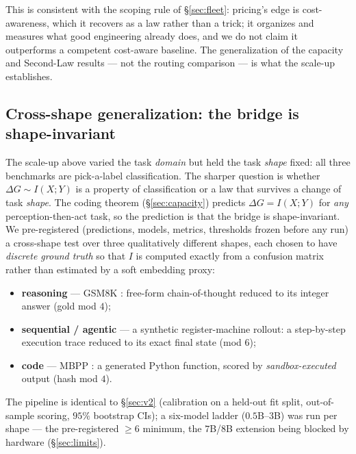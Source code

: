 \documentclass[11pt]{article}
\theoremstyle{plain}
\theoremstyle{definition}
\theoremstyle{remark}
\newcommand{\I}{I}
\begin{document}
\noindent This is consistent with the scoping rule of \S\ref{sec:fleet}: pricing's edge is cost-awareness, which
it recovers as a law rather than a trick; it organizes and measures what good engineering already does, and we do
not claim it outperforms a competent cost-aware baseline. The generalization of the capacity and Second-Law
results --- not the routing comparison --- is what the scale-up establishes.

\subsection{Cross-shape generalization: the bridge is shape-invariant}\label{sec:shapes}

The scale-up above varied the task \emph{domain} but held the task \emph{shape} fixed: all three benchmarks are
pick-a-label classification. The sharper question is whether $\Delta G\sim\I(X;Y)$ is a property of
classification or a law that survives a change of task \emph{shape}. The coding theorem (\S\ref{sec:capacity})
predicts $\Delta G=\I(X;Y)$ for \emph{any} perception-then-act task, so the prediction is that the bridge is
shape-invariant. We pre-registered (predictions, models, metrics, thresholds frozen before any run) a cross-shape
test over three qualitatively different shapes, each chosen to have \emph{discrete ground truth} so that $\I$ is
computed exactly from a confusion matrix rather than estimated by a soft embedding proxy:
\begin{itemize}[noitemsep,topsep=2pt]
\item \textbf{reasoning} --- GSM8K \citep{cobbe2021gsm8k}: free-form chain-of-thought reduced to its integer
answer (gold mod $4$);
\item \textbf{sequential / agentic} --- a synthetic register-machine rollout: a step-by-step execution trace
reduced to its exact final state (mod $6$);
\item \textbf{code} --- MBPP \citep{austin2021mbpp}: a generated Python function, scored by
\emph{sandbox-executed} output (hash mod $4$).
\end{itemize}
The pipeline is identical to \S\ref{sec:v2} (calibration on a held-out fit split, out-of-sample scoring, $95\%$
bootstrap CIs); a six-model ladder ($0.5$B--$3$B) was run per shape --- the pre-registered $\ge\!6$ minimum, the
$7$B/$8$B extension being blocked by hardware (\S\ref{sec:limits}).
\end{document}
